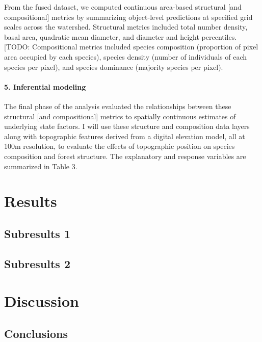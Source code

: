 \documentclass[
  12pt,
]{article}
\begin{document}
From the fused dataset, we computed continuous area-based structural
{[}and compositional{]} metrics by summarizing object-level predictions
at specified grid scales across the watershed. Structural metrics
included total number density, basal area, quadratic mean diameter, and
diameter and height percentiles. {[}TODO: Compositional metrics included
species composition (proportion of pixel area occupied by each species),
species density (number of individuals of each species per pixel), and
species dominance (majority species per pixel).

\hypertarget{inferential-modeling}{%
\paragraph{5. Inferential modeling}\label{inferential-modeling}}

The final phase of the analysis evaluated the relationships between
these structural {[}and compositional{]} metrics to spatially continuous
estimates of underlying state factors. I will use these structure and
composition data layers along with topographic features derived from a
digital elevation model, all at 100m resolution, to evaluate the effects
of topographic position on species composition and forest structure. The
explanatory and response variables are summarized in Table 3.

\hypertarget{results}{%
\section{Results}\label{results}}

\hypertarget{subresults-1}{%
\subsection{Subresults 1}\label{subresults-1}}

\hypertarget{subresults-2}{%
\subsection{Subresults 2}\label{subresults-2}}

\hypertarget{discussion}{%
\section{Discussion}\label{discussion}}

\hypertarget{conclusions}{%
\subsection{Conclusions}\label{conclusions}}
\end{document}

